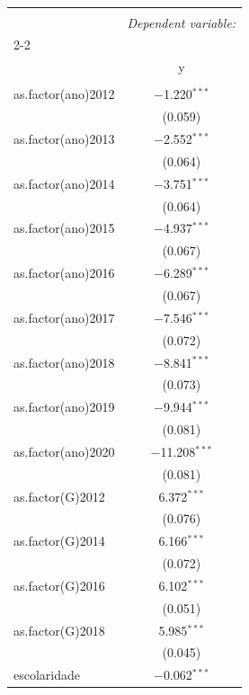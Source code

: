 \documentclass[portugues]{article}
\begin{document}
\begin{box_code}
\begingroup
    \fontsize{8pt}{12pt}\selectfont
    \begin{center}
    \caption{Modelo y(0) para imputation} \\
    \begin{tabular}{@{\extracolsep{5pt}}lc} 
    \\[-1.8ex]\hline 
    \hline \\[-1.8ex] 
     & \multicolumn{1}{c}{\textit{Dependent variable:}} \\ 
    \cline{2-2} 
    \\[-1.8ex] & y \\ 
    \hline \\[-1.8ex] 
     as.factor(ano)2012 & $-$1.220$^{***}$ \\ 
      & (0.059) \\ 
     as.factor(ano)2013 & $-$2.552$^{***}$ \\ 
      & (0.064) \\ 
     as.factor(ano)2014 & $-$3.751$^{***}$ \\ 
      & (0.064) \\ 
     as.factor(ano)2015 & $-$4.937$^{***}$ \\ 
      & (0.067) \\ 
     as.factor(ano)2016 & $-$6.289$^{***}$ \\ 
      & (0.067) \\ 
     as.factor(ano)2017 & $-$7.546$^{***}$ \\ 
      & (0.072) \\ 
     as.factor(ano)2018 & $-$8.841$^{***}$ \\ 
      & (0.073) \\ 
     as.factor(ano)2019 & $-$9.944$^{***}$ \\ 
      & (0.081) \\ 
     as.factor(ano)2020 & $-$11.208$^{***}$ \\ 
      & (0.081) \\ 
     as.factor(G)2012 & 6.372$^{***}$ \\ 
      & (0.076) \\ 
     as.factor(G)2014 & 6.166$^{***}$ \\ 
      & (0.072) \\ 
     as.factor(G)2016 & 6.102$^{***}$ \\ 
      & (0.051) \\ 
     as.factor(G)2018 & 5.985$^{***}$ \\ 
      & (0.045) \\ 
     escolaridade & $-$0.062$^{***}$ \\ 

\end{tabular}
\end{center}
\end{box_code}
\end{document}
